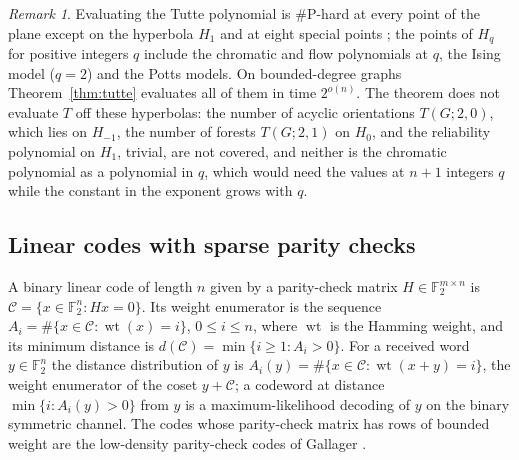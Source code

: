 \documentclass[11pt,reqno]{amsart}
\numberwithin{equation}{section}
\theoremstyle{plain}
\theoremstyle{definition}
\theoremstyle{remark}
\newtheorem{remark}[theorem]{Remark}
\newcommand{\Ftwo}{\mathbb{F}_2}
\begin{document}
\begin{remark}\label{rem:tutte}
Evaluating the Tutte polynomial is $\#$P-hard at every point of the plane
except on the hyperbola $H_1$ and at eight special points \cite{JVW90}; the
points of $H_q$ for positive integers $q$ include the chromatic and flow
polynomials at $q$, the Ising model ($q=2$) and the Potts models. On
bounded-degree graphs Theorem~\ref{thm:tutte} evaluates all of them in time
$2^{o(n)}$. The theorem does not evaluate $T$ off these hyperbolas: the number
of acyclic orientations $T(G;2,0)$, which lies on $H_{-1}$, the number of
forests $T(G;2,1)$ on $H_0$, and the reliability polynomial on $H_1$, trivial,
are not covered, and neither is the chromatic polynomial as a polynomial in $q$,
which would need the values at $n+1$ integers $q$ while the constant in the
exponent grows with $q$.
\end{remark}

\subsection{Linear codes with sparse parity checks}\label{ssec:codes}
A binary linear code of length $n$ given by a parity-check matrix
$H\in\Ftwo^{m\times n}$ is $\mathcal C=\{x\in\Ftwo^n:Hx=0\}$. Its weight
enumerator is the sequence $A_i=\#\{x\in\mathcal C:\operatorname{wt}(x)=i\}$,
$0\le i\le n$, where $\operatorname{wt}$ is the Hamming weight, and its minimum
distance is $d(\mathcal C)=\min\{i\ge1:A_i>0\}$. For a received word
$y\in\Ftwo^n$ the distance distribution of $y$ is
$A_i(y)=\#\{x\in\mathcal C:\operatorname{wt}(x+y)=i\}$, the weight enumerator of
the coset $y+\mathcal C$; a codeword at distance $\min\{i:A_i(y)>0\}$ from $y$ is a
maximum-likelihood decoding of $y$ on the binary symmetric channel. The codes
whose parity-check matrix has rows of bounded weight are the low-density
parity-check codes of Gallager \cite{Gal62}.
\end{document}
